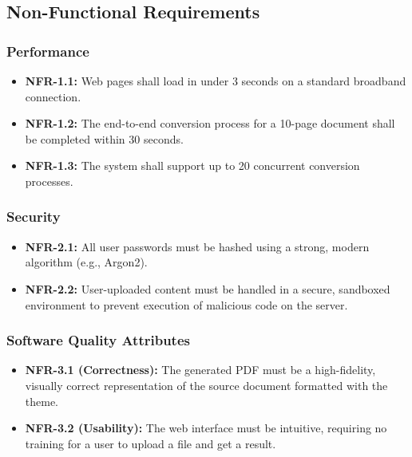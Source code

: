 \documentclass[a4paper, 11pt]{article}
\begin{document}
\subsection{Non-Functional Requirements}
\subsubsection{Performance}
\begin{itemize}
    \item[{\color{AUCDTCampusGreen}\faTachometerAlt}] \textbf{NFR-1.1:} Web pages shall load in under 3 seconds on a standard broadband connection.
    \item[{\color{AUCDTCampusGreen}\faTachometerAlt}] \textbf{NFR-1.2:} The end-to-end conversion process for a 10-page document shall be completed within 30 seconds.
    \item[{\color{AUCDTCampusGreen}\faTachometerAlt}] \textbf{NFR-1.3:} The system shall support up to 20 concurrent conversion processes.
\end{itemize}

\subsubsection{Security}
\begin{itemize}
    \item[{\color{AUCDTCampusGreen}\faShieldAlt}] \textbf{NFR-2.1:} All user passwords must be hashed using a strong, modern algorithm (e.g., Argon2).
    \item[{\color{AUCDTCampusGreen}\faShieldAlt}] \textbf{NFR-2.2:} User-uploaded content must be handled in a secure, sandboxed environment to prevent execution of malicious code on the server.
\end{itemize}

\subsubsection{Software Quality Attributes}
\begin{itemize}
    \item[{\color{AUCDTCampusGreen}\faStar}] \textbf{NFR-3.1 (Correctness):} The generated PDF must be a high-fidelity, visually correct representation of the source document formatted with the theme.
    \item[{\color{AUCDTCampusGreen}\faStar}] \textbf{NFR-3.2 (Usability):} The web interface must be intuitive, requiring no training for a user to upload a file and get a result.
\end{itemize}
\end{document}
